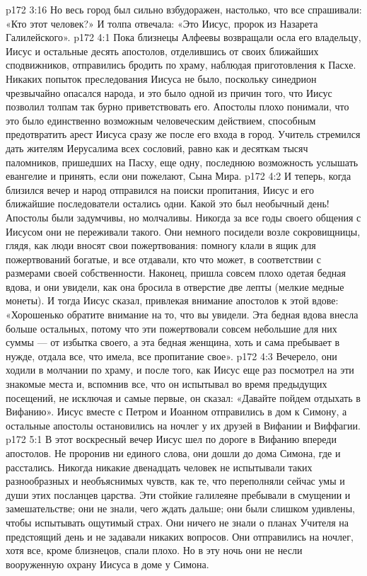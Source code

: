 \vs p172 3:16 Но весь город был сильно взбудоражен, настолько, что все спрашивали: «Кто этот человек?» И толпа отвечала: «Это Иисус, пророк из Назарета Галилейского».
\vs p172 4:1 Пока близнецы Алфеевы возвращали осла его владельцу, Иисус и остальные десять апостолов, отделившись от своих ближайших сподвижников, отправились бродить по храму, наблюдая приготовления к Пасхе. Никаких попыток преследования Иисуса не было, поскольку синедрион чрезвычайно опасался народа, и это было одной из причин того, что Иисус позволил толпам так бурно приветствовать его. Апостолы плохо понимали, что это было единственно возможным человеческим действием, способным предотвратить арест Иисуса сразу же после его входа в город. Учитель стремился дать жителям Иерусалима всех сословий, равно как и десяткам тысяч паломников, пришедших на Пасху, еще одну, последнюю возможность услышать евангелие и принять, если они пожелают, Сына Мира.
\vs p172 4:2 И теперь, когда близился вечер и народ отправился на поиски пропитания, Иисус и его ближайшие последователи остались одни. Какой это был необычный день! Апостолы были задумчивы, но молчаливы. Никогда за все годы своего общения с Иисусом они не переживали такого. Они немного посидели возле сокровищницы, глядя, как люди вносят свои пожертвования: помногу клали в ящик для пожертвований богатые, и все отдавали, кто что может, в соответствии с размерами своей собственности. Наконец, пришла совсем плохо одетая бедная вдова, и они увидели, как она бросила в отверстие две лепты (мелкие медные монеты). И тогда Иисус сказал, привлекая внимание апостолов к этой вдове: «Хорошенько обратите внимание на то, что вы увидели. Эта бедная вдова внесла больше остальных, потому что эти пожертвовали совсем небольшие для них суммы --- от избытка своего, а эта бедная женщина, хоть и сама пребывает в нужде, отдала все, что имела, все пропитание свое».
\vs p172 4:3 Вечерело, они ходили в молчании по храму, и после того, как Иисус еще раз посмотрел на эти знакомые места и, вспомнив все, что он испытывал во время предыдущих посещений, не исключая и самые первые, он сказал: «Давайте пойдем отдыхать в Вифанию». Иисус вместе с Петром и Иоанном отправились в дом к Симону, а остальные апостолы остановились на ночлег у их друзей в Вифании и Виффагии.
\vs p172 5:1 В этот воскресный вечер Иисус шел по дороге в Вифанию впереди апостолов. Не проронив ни единого слова, они дошли до дома Симона, где и расстались. Никогда никакие двенадцать человек не испытывали таких разнообразных и необъяснимых чувств, как те, что переполняли сейчас умы и души этих посланцев царства. Эти стойкие галилеяне пребывали в смущении и замешательстве; они не знали, чего ждать дальше; они были слишком удивлены, чтобы испытывать ощутимый страх. Они ничего не знали о планах Учителя на предстоящий день и не задавали никаких вопросов. Они отправились на ночлег, хотя все, кроме близнецов, спали плохо. Но в эту ночь они не несли вооруженную охрану Иисуса в доме у Симона.
